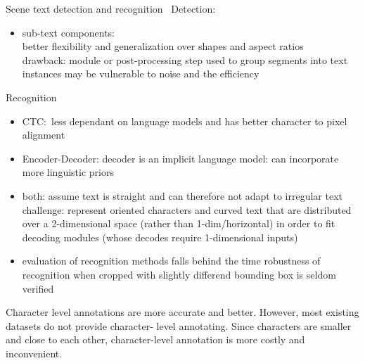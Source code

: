 

Scene text detection and recognition~\cite{long_scene_2021}
Detection:
\begin{itemize}
    \item sub-text components: \\
        better flexibility and generalization over shapes and aspect ratios\\
        drawback: module or post-processing step used to group segments into text instances
        may be vulnerable to noise and the efficiency
\end{itemize}
Recognition
\begin{itemize}
    \item CTC:\ less dependant on language models and has better character to pixel alignment
    \item Encoder-Decoder: decoder is an implicit language model: can incorporate more linguistic priors
    \item both: assume text is straight and can therefore not adapt to irregular text
        challenge: represent oriented characters and curved text that are distributed over a
        2-dimensional space
            (rather than 1-dim/horizontal) in order to fit decoding modules (whose decodes require
            1-dimensional inputs)
        \item evaluation of recognition methods falls behind the time robustness of recognition when
            cropped with slightly differend bounding box is seldom verified
\end{itemize}
Character level annotations are more accurate and better. However, most existing datasets do not
provide character- level annotating. Since characters are smaller and close to each other,
character-level annotation is more costly and inconvenient.
